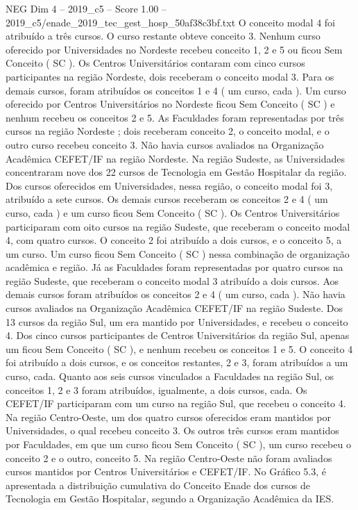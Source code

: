 \begin{textsample}{NEG Dim 4 – 2019\_c5 – Score 1.00 – 2019\_c5/enade\_2019\_tec\_gest\_hosp\_50af38c3bf.txt}
O conceito modal 4 foi atribuído a três cursos.
O curso restante obteve conceito 3.
Nenhum curso oferecido por Universidades no Nordeste recebeu conceito 1, 2 e 5 ou ficou Sem Conceito ( SC ).
Os Centros Universitários contaram com cinco cursos participantes na região Nordeste, dois receberam o conceito modal 3.
Para os demais cursos, foram atribuídos os conceitos 1 e 4 ( um curso, cada ).
Um curso oferecido por Centros Universitários no Nordeste ficou Sem Conceito ( SC ) e nenhum recebeu os conceitos 2 e 5.
As Faculdades foram representadas por três cursos na região Nordeste ; dois receberam conceito 2, o conceito modal, e o outro curso recebeu conceito 3.
Não havia cursos avaliados na Organização Acadêmica CEFET/IF na região Nordeste.
Na região Sudeste, as Universidades concentraram nove dos 22 cursos de Tecnologia em Gestão Hospitalar da região.
Dos cursos oferecidos em Universidades, nessa região, o conceito modal foi 3, atribuído a sete cursos.
Os demais cursos receberam os conceitos 2 e 4 ( um curso, cada ) e um curso ficou Sem Conceito ( SC ).
Os Centros Universitários participaram com oito cursos na região Sudeste, que receberam o conceito modal 4, com quatro cursos.
O conceito 2 foi atribuído a dois cursos, e o conceito 5, a um curso.
Um curso ficou Sem Conceito ( SC ) nessa combinação de organização acadêmica e região.
Já as Faculdades foram representadas por quatro cursos na região Sudeste, que receberam o conceito modal 3 atribuído a dois cursos.
Aos demais cursos foram atribuídos os conceitos 2 e 4 ( um curso, cada ).
Não havia cursos avaliados na Organização Acadêmica CEFET/IF na região Sudeste.
Dos 13 cursos da região Sul, um era mantido por Universidades, e recebeu o conceito 4.
Dos cinco cursos participantes de Centros Universitários da região Sul, apenas um ficou Sem Conceito ( SC ), e nenhum recebeu os conceitos 1 e 5.
O conceito 4 foi atribuído a dois cursos, e os conceitos restantes, 2 e 3, foram atribuídos a um curso, cada.
Quanto aos seis cursos vinculados a Faculdades na região Sul, os conceitos 1, 2 e 3 foram atribuídos, igualmente, a dois cursos, cada.
Os CEFET/IF participaram com um curso na região Sul, que recebeu o conceito 4.
Na região Centro-Oeste, um dos quatro cursos oferecidos eram mantidos por Universidades, o qual recebeu conceito 3.
Os outros três cursos eram mantidos por Faculdades, em que um curso ficou Sem Conceito ( SC ), um curso recebeu o conceito 2 e o outro, conceito 5.
Na região Centro-Oeste não foram avaliados cursos mantidos por Centros Universitários e CEFET/IF.
No Gráfico 5.3, é apresentada a distribuição cumulativa do Conceito Enade dos cursos de Tecnologia em Gestão Hospitalar, segundo a Organização Acadêmica da IES.

\end{textsample}
